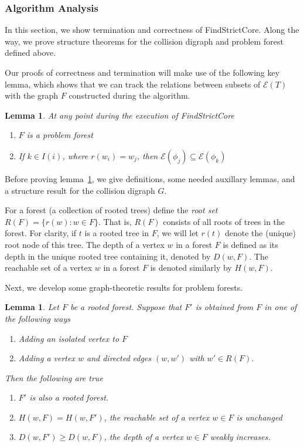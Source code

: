 \documentclass[11pt,reqno]{amsart}
\newtheorem{lemma}[thm]{Lemma}
\theoremstyle{definition}
\numberwithin{equation}{section}
\newcommand{\pre}{\phi}
\newcommand{\sub}{\subseteq}
\newcommand{\fix}{\mathcal{E}}
\newcommand{\coll}{I}
\newcommand{\reach}{H}
\newcommand{\forest}{F}
\newcommand{\roott}{R}
\newcommand{\depth}{D}
\begin{document}
\subsubsection{Algorithm Analysis}

In this section, we show termination and correctness of FindStrictCore.
Along the way, we prove structure theorems for the collision digraph and problem forest defined above.

Our proofs of correctness and termination will make use of the following key lemma, which shows that we can track the relations between subsets of $\fix(T)$ with the graph $F$ constructed during the algorithm.

\begin{lemma} \label{lemma:key}
At any point during the execution of FindStrictCore 
\begin{enumerate}
\item $\forest$ is a problem forest \label{convlemma:forest}
\item If $k \in \coll(i)$, where $r(w_i) = w_j$, then $\fix(\pre_j) \sub \fix(\pre_k)$ \label{convlemma:coll}
\end{enumerate}
\end{lemma}

Before proving lemma~\ref{lemma:key}, we give definitions, some needed auxillary lemmas, and a structure result for the collision digraph $G$. 

For a forest (a collection of rooted trees) define the \emph{root set} $\roott(\forest) = \{r(w): w\in F\}$. 
That is, $\roott(\forest)$ consists of all roots of trees in the forest.
For clarity, if $t$ is a rooted tree in $\forest$, we will let $r(t)$ denote the (unique) root node of this tree.
The depth of a vertex $w$ in a forest $\forest$ is defined as its depth in the unique rooted tree containing it, denoted by $\depth(w, \forest)$.
The reachable set of a vertex $w$ in a forest $\forest$ is denoted similarly by $\reach(w, \forest)$.

Next, we develop some graph-theoretic results for problem forests. 

\begin{lemma} \label{lemma:forest}
Let $\forest$ be a rooted forest. 
Suppose that $\forest'$ is obtained from $\forest$ in one of the following ways 
\begin{enumerate}
\item Adding an isolated vertex to $\forest$ \label{forest:solo}
\item Adding a vertex $w$ and directed edges $(w,w')$ with $w' \in \roott(\forest)$. \label{forest:child}
\end{enumerate}
Then the following are true  
\begin{enumerate}
\item[(i)] $\forest'$ is also a rooted forest. 
\item[(ii)] $\reach(w,\forest) = \reach(w,\forest')$, the reachable set of a vertex $w \in \forest$ is unchanged
\item[(iii)] $\depth(w,\forest') \geq \depth(w,\forest)$, the depth of a vertex $w \in \forest$ weakly increases.
\end{enumerate}


\end{lemma}
\end{document}
